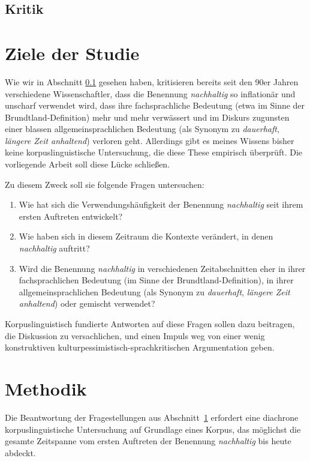 \documentclass[
    german,
    a4paper,%
    12pt,%
    oneside,%
    toc=bibliography,
    final,
]{scrartcl}
\begin{document}
\subsection{Kritik}
\label{subsec:kritik}

\section{Ziele der Studie}
\label{sec:ziele}

Wie wir in Abschnitt \ref{subsec:kritik} gesehen haben, kritisieren bereits seit den 90er Jahren verschiedene Wissenschaftler, dass die Benennung \textit{nachhaltig} so inflationär und unscharf verwendet wird, dass ihre fachsprachliche Bedeutung (etwa im Sinne der Brundtland-Definition) mehr und mehr verwässert und im Diskurs zugunsten einer blassen allgemeinsprachlichen Bedeutung (als Synonym zu \textit{dauerhaft}, \textit{längere Zeit anhaltend}) verloren geht. Allerdings gibt es meines Wissens bisher keine korpuslinguistische Untersuchung, die diese These empirisch überprüft. Die vorliegende Arbeit soll diese Lücke schließen.

Zu diesem Zweck soll sie folgende Fragen untersuchen:

\begin{enumerate}
\item Wie hat sich die Verwendungshäufigkeit der Benennung \textit{nachhaltig} seit ihrem ersten Auftreten entwickelt?
\item Wie haben sich in diesem Zeitraum die Kontexte verändert, in denen \textit{nachhaltig} auftritt?
\item Wird die Benennung \textit{nachhaltig} in verschiedenen Zeitabschnitten eher in ihrer fachsprachlichen Bedeutung (im Sinne der Brundtland-Definition), in ihrer allgemeinsprachlichen Bedeutung (als Synonym zu \textit{dauerhaft}, \textit{längere Zeit anhaltend}) oder gemischt verwendet?
\end{enumerate}

Korpuslinguistisch fundierte Antworten auf diese Fragen sollen dazu beitragen, die Diskussion zu versachlichen, und einen Impuls weg von einer wenig konstruktiven kulturpessimistisch-sprachkritischen Argumentation geben.

\section{Methodik}
\label{sec:methodik}

Die Beantwortung der Fragestellungen aus Abschnitt~\ref{sec:ziele} erfordert eine diachrone korpuslinguistische Untersuchung auf Grundlage eines Korpus, das möglichst die gesamte Zeitspanne vom ersten Auftreten der Benennung \textit{nachhaltig} bis heute abdeckt.
\end{document}
